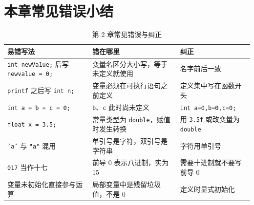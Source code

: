 \section{本章常见错误小结}

\begin{table}[htbp]
\centering
\caption{第 2 章常见错误与纠正}
\small
\begin{tabularx}{\textwidth}{@{}lXl@{}}
\toprule
易错写法 & 错在哪里 & 纠正 \\
\midrule
\texttt{int newVa1ue;} 后写 \texttt{newvalue = 0;} & 变量名区分大小写，等于未定义就使用 & 名字前后一致 \\
\texttt{printf} 之后写 \texttt{int n;} & 变量必须在可执行语句之前定义 & 定义集中写在函数开头 \\
\texttt{int a = b = c = 0;} & \texttt{b}、\texttt{c} 此时尚未定义 & \texttt{int a=0,b=0,c=0;} \\
\texttt{float x = 3.5;} & 常量类型为 \texttt{double}，赋值时发生转换 & 用 \texttt{3.5f} 或改变量为 \texttt{double} \\
\texttt{'a'} 与 \texttt{"a"} 混用 & 单引号是字符，双引号是字符串 & 字符用单引号 \\
\texttt{017} 当作十七 & 前导 0 表示八进制，实为 15 & 需要十进制就不要写前导 0 \\
变量未初始化直接参与运算 & 局部变量中是残留垃圾值，不是 0 & 定义时显式初始化 \\
\bottomrule
\end{tabularx}
\end{table}
